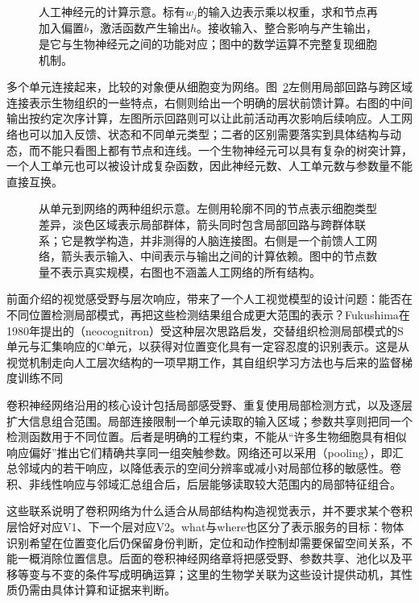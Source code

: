 \begin{figure}[htbp]
  \centering
  
  \caption{人工神经元的计算示意。标有$w_j$的输入边表示乘以权重，求和节点再加入偏置$b$，激活函数产生输出$h$。接收输入、整合影响与产生输出，是它与生物神经元之间的功能对应；图中的数学运算不完整复现细胞机制。}
  \label{fig:neural-unit-abstraction}
\end{figure}

多个单元连接起来，比较的对象便从细胞变为网络。图~\ref{fig:neural-biological-artificial-networks}左侧用局部回路与跨区域连接表示生物组织的一些特点，右侧则给出一个明确的层状前馈计算。右图的中间输出按约定次序计算，左图所示回路则可以让此前活动再次影响后续响应。人工网络也可以加入反馈、状态和不同单元类型；二者的区别需要落实到具体结构与动态，而不能只看图上都有节点和连线。一个生物神经元可以具有复杂的树突计算，一个人工单元也可以被设计成复杂函数，因此神经元数、人工单元数与参数量不能直接互换。

\begin{figure}[htbp]
  \centering
  
  \caption{从单元到网络的两种组织示意。左侧用轮廓不同的节点表示细胞类型差异，淡色区域表示局部群体，箭头同时包含局部回路与跨群体联系；它是教学构造，并非测得的人脑连接图。右侧是一个前馈人工网络，箭头表示输入、中间表示与输出之间的计算依赖。图中的节点数量不表示真实规模，右图也不涵盖人工网络的所有结构。}
  \label{fig:neural-biological-artificial-networks}
\end{figure}
\FloatBarrier

前面介绍的视觉感受野与层次响应，带来了一个人工视觉模型的设计问题：能否在不同位置检测局部模式，再把这些检测结果组合成更大范围的表示？Fukushima在1980年提出的（neocognitron）受这种层次思路启发，交替组织检测局部模式的S单元与汇集响应的C单元，以获得对位置变化具有一定容忍度的识别表示。这是从视觉机制走向人工层次结构的一项早期工作，其自组织学习方法也与后来的监督梯度训练不同

卷积神经网络沿用的核心设计包括局部感受野、重复使用局部检测方式，以及逐层扩大信息组合范围。局部连接限制一个单元读取的输入区域；参数共享则把同一个检测函数用于不同位置。后者是明确的工程约束，不能从“许多生物细胞具有相似响应偏好”推出它们精确共享同一组突触参数。网络还可以采用（pooling），即汇总邻域内的若干响应，以降低表示的空间分辨率或减小对局部位移的敏感性。卷积、非线性响应与邻域汇总组合后，后层能够读取较大范围内的局部特征组合。

这些联系说明了卷积网络为什么适合从局部结构构造视觉表示，并不要求某个卷积层恰好对应V1、下一个层对应V2。what与where也区分了表示服务的目标：物体识别希望在位置变化后仍保留身份判断，定位和动作控制却需要保留空间关系，不能一概消除位置信息。后面的卷积神经网络章将把感受野、参数共享、池化以及平移等变与不变的条件写成明确运算；这里的生物学关联为这些设计提供动机，其性质仍需由具体计算和证据来判断。

